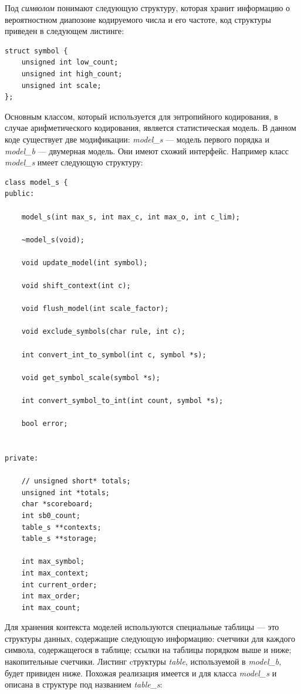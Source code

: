 \documentclass{matmex-diploma-custom}
\begin{document}
Под \emph{символом} понимают следующую структуру, которая хранит информацию о вероятностном диапозоне кодируемого числа и его частоте, код структуры приведен в следующем листинге:

\begin{lstlisting}
struct symbol {
    unsigned int low_count;
    unsigned int high_count;
    unsigned int scale;
};
\end{lstlisting}

Основным классом, который используется для энтропийного кодирования, в случае арифметического кодирования, является статистическая модель. В данном коде существует две модификации: \emph{model\_s} --- модель первого порядка и \emph{model\_b} --- двумерная модель. Они имеют схожий интерфейс. Например класс \emph{model\_s} имеет следующую структуру:

\begin{lstlisting}
class model_s {
public:

    model_s(int max_s, int max_c, int max_o, int c_lim);

    ~model_s(void);

    void update_model(int symbol);

    void shift_context(int c);

    void flush_model(int scale_factor);

    void exclude_symbols(char rule, int c);

    int convert_int_to_symbol(int c, symbol *s);

    void get_symbol_scale(symbol *s);

    int convert_symbol_to_int(int count, symbol *s);

    bool error;


private:

    // unsigned short* totals;
    unsigned int *totals;
    char *scoreboard;
    int sb0_count;
    table_s **contexts;
    table_s **storage;

    int max_symbol;
    int max_context;
    int current_order;
    int max_order;
    int max_count;
\end{lstlisting}

Для хранения контекста моделей используются специальные таблицы --- это структуры данных, содержащие следующую информацию: счетчики для каждого символа, содержащегося в таблице; ссылки на таблицы порядком выше и ниже; накопительные счетчики. Листинг cтруктуры \emph{table}, используемой в \emph{model\_b}, будет привиден ниже. Похожая реализация имеется и для класса \emph{model\_s} и описана в структуре под названием \emph{table\_s}:
\end{document}
